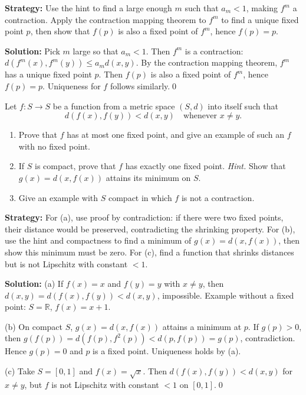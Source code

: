 \noindent\textbf{Strategy:} Use the hint to find a large enough $m$ such that $a_m < 1$, making $f^m$ a contraction. Apply the contraction mapping theorem to $f^m$ to find a unique fixed point $p$, then show that $f(p)$ is also a fixed point of $f^m$, hence $f(p) = p$.

\bigskip\noindent\textbf{Solution:}
Pick $m$ large so that $a_m<1$. Then $f^m$ is a contraction: $d(f^m(x),f^m(y))\le a_m d(x,y)$. By the contraction mapping theorem, $f^m$ has a unique fixed point $p$. Then $f(p)$ is also a fixed point of $f^m$, hence $f(p)=p$. Uniqueness for $f$ follows similarly.\qed



\begin{problembox}
Let $f: S \to S$ be a function from a metric space $(S, d)$ into itself such that
\[ d(f(x), f(y)) < d(x, y) \quad \text{whenever } x \neq y. \]
\begin{enumerate}[label=(\alph*)]
\item Prove that $f$ has at most one fixed point, and give an example of such an $f$ with no fixed point.
\item If $S$ is compact, prove that $f$ has exactly one fixed point. \textit{Hint.} Show that $g(x) = d(x, f(x))$ attains its minimum on $S$.
\item Give an example with $S$ compact in which $f$ is not a contraction.
\end{enumerate}
\end{problembox}

\noindent\textbf{Strategy:} For (a), use proof by contradiction: if there were two fixed points, their distance would be preserved, contradicting the shrinking property. For (b), use the hint and compactness to find a minimum of $g(x) = d(x, f(x))$, then show this minimum must be zero. For (c), find a function that shrinks distances but is not Lipschitz with constant $< 1$.

\bigskip\noindent\textbf{Solution:}
(a) If $f(x)=x$ and $f(y)=y$ with $x\ne y$, then $d(x,y)=d(f(x),f(y))<d(x,y)$, impossible. Example without a fixed point: $S=\mathbb{R}$, $f(x)=x+1$.

(b) On compact $S$, $g(x)=d(x,f(x))$ attains a minimum at $p$. If $g(p)>0$, then $g(f(p))=d(f(p),f^2(p))<d(p,f(p))=g(p)$, contradiction. Hence $g(p)=0$ and $p$ is a fixed point. Uniqueness holds by (a).

(c) Take $S=[0,1]$ and $f(x)=\sqrt{x}$. Then $d(f(x),f(y))<d(x,y)$ for $x\ne y$, but $f$ is not Lipschitz with constant $<1$ on $[0,1]$.\qed



